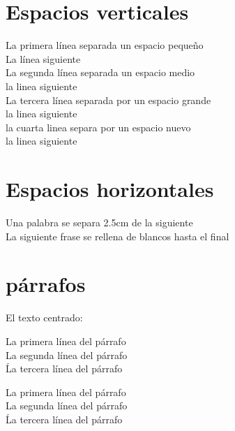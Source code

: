 \documentclass[10pt,a4paper]{article}
\begin{document}
\section{Espacios verticales}

La primera línea separada un espacio pequeño
\smallskip \\
La línea siguiente \\ 
La segunda línea separada un espacio medio
\medskip \\
la linea siguiente \\
La tercera línea separada por un espacio grande
\bigskip \\
la linea siguiente \\
la cuarta linea separa por un espacio nuevo
\vspace{3cm} \\
la linea siguiente \\

\section{Espacios horizontales}
Una palabra se separa 2.5cm 
\hspace{2.5cm} de la siguiente \\
La siguiente frase se 
\hfill{rellena de blancos hasta el final}

\section{párrafos}

El texto centrado:
\begin{flushleft}
	La primera línea del párrafo
	\vspace{1cm} \\
	La segunda línea del párrafo
	\vspace{2cm} \\
	Ĺa tercera línea del párrafo
	\vspace{3cm} \\
\end{flushleft}

\begin{center}
	La primera línea del párrafo
	\vspace{4cm} \\
	La segunda línea del párrafo
	\vspace{5cm} \\
	Ĺa tercera línea del párrafo
	\vspace{6cm} \\
\end{center}
\end{document}
